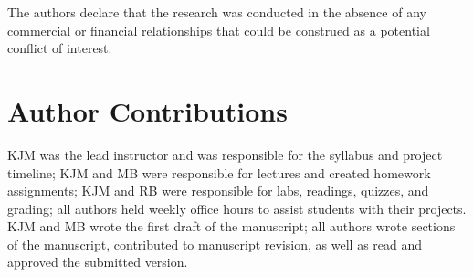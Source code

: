 The authors declare that the research was conducted in the absence of any
commercial or financial relationships that could be construed as a potential
conflict of interest.

\section*{Author Contributions}

KJM was the lead instructor and was responsible for the syllabus and project timeline;
KJM and MB were responsible for lectures and created homework assignments;
KJM and RB were responsible for labs, readings, quizzes, and grading;
all authors held weekly office hours to assist students with their projects.
KJM and MB wrote the first draft of the manuscript;
all authors wrote sections of the manuscript, contributed to manuscript revision, 
as well as read and approved the submitted version.

